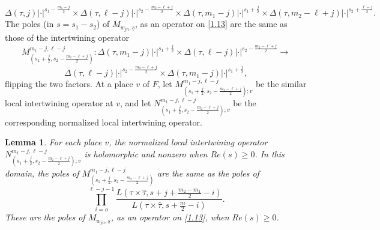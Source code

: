 \documentclass[12pts]{amsart}
\newtheorem{lem}[thm]{Lemma}
\begin{document}
\\
\begin{equation}\label{1.14}
	\Delta(\tau,j)|\cdot|^{s_1-\frac{m_1-j}{2}}\times \Delta(\tau,\ell-j)|\cdot|^{s_2-\frac{m_2-\ell+j}{2}}\times \Delta(\tau,m_1-j)|\cdot|^{s_1+\frac{j}{2}}\times \Delta(\tau,m_2-\ell+j)|\cdot|^{s_2+\frac{\ell-j}{2}}.
\end{equation}	    	
The poles (in $s=s_1-s_2$) of $M_{w_{jn},\underline{s}}$, as an operator on \eqref{1.13} are the same as those of the intertwining operator
\begin{equation}\label{1.15}
	M^{m_1-j,\ell-j}_{(s_1+\frac{j}{2},s_2-\frac{m_2-\ell+j}{2})}: \Delta(\tau,m_1-j)|\cdot|^{s_1+\frac{j}{2}}\times \Delta(\tau,\ell-j)|\cdot|^{s_2-\frac{m_2-\ell+j}{2}}\rightarrow 
\end{equation}
$$
	 \Delta(\tau,\ell-j)|\cdot|^{s_2-\frac{m_2-\ell+j}{2}}\times \Delta(\tau,m_1-j)|\cdot|^{s_1+\frac{j}{2}},
$$
flipping the two factors. At a place $v$ of $F$, let $M^{m_1-j,\ell-j}_{(s_1+\frac{j}{2},s_2-\frac{m_2-\ell+j}{2});v}$ be the similar local intertwining operator at $v$, and let $N^{m_1-j,\ell-j}_{(s_1+\frac{j}{2},s_2-\frac{m_2-\ell+j}{2});v}$ be the corresponding normalized local intertwining operator.
\begin{lem}\label{lem 1.2}
For each place $v$, the normalized local intertwining operator\\ 	$N^{m_1-j,\ell-j}_{(s_1+\frac{j}{2},s_2-\frac{m_2-\ell+j}{2});v}$ is holomorphic and nonzero when $Re(s)\geq 0$. In this domain, the poles of $	M^{m_1-j,\ell-j}_{(s_1+\frac{j}{2},s_2-\frac{m_2-\ell+j}{2})}$ are the same as the poles of
\begin{equation}\label{1.16}
	\prod_{i=o}^{\ell-j-1}\frac{L(\tau\times\hat{\tau},s+j+\frac{m_2-m_1}{2}-i)}{L(\tau\times\hat{\tau},s+\frac{m}{2}-i)}.
\end{equation}
These are the poles of $ M_{w_{jn},\underline{s}}$, as an operator on \eqref{1.13}, when $Re(s)\geq 0$.
\end{lem}
\end{document}
